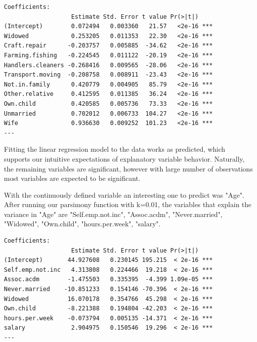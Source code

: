 \documentclass[letter]{article}
\begin{document}
\begin{verbatim}
Coefficients:
                   Estimate Std. Error t value Pr(>|t|)    
(Intercept)        0.072494   0.003360   21.57   <2e-16 ***
Widowed            0.253205   0.011353   22.30   <2e-16 ***
Craft.repair      -0.203757   0.005885  -34.62   <2e-16 ***
Farming.fishing   -0.224545   0.011122  -20.19   <2e-16 ***
Handlers.cleaners -0.268416   0.009565  -28.06   <2e-16 ***
Transport.moving  -0.208758   0.008911  -23.43   <2e-16 ***
Not.in.family      0.420779   0.004905   85.79   <2e-16 ***
Other.relative     0.412595   0.011385   36.24   <2e-16 ***
Own.child          0.420585   0.005736   73.33   <2e-16 ***
Unmarried          0.702012   0.006733  104.27   <2e-16 ***
Wife               0.936630   0.009252  101.23   <2e-16 ***
---

\end{verbatim}

Fitting the linear regression model to the data works as predicted, which supports our intuitive expectations of explanatory variable behavior. Naturally, the remaining variables are significant, however with large number of observations most variables are expected to be significant. 


With the continuously defined variable an interesting one to predict was "Age". After running our parsimony function with k=0.01, the variables that explain the variance in "Age" are "Self.emp.not.inc", "Assoc.acdm", "Never.married", "Widowed", "Own.child", "hours.per.week", "salary".   

\begin{verbatim}
Coefficients:
                   Estimate Std. Error t value Pr(>|t|)    
(Intercept)       44.927608   0.230145 195.215  < 2e-16 ***
Self.emp.not.inc   4.313808   0.224466  19.218  < 2e-16 ***
Assoc.acdm        -1.475503   0.335395  -4.399 1.09e-05 ***
Never.married    -10.851233   0.154146 -70.396  < 2e-16 ***
Widowed           16.070178   0.354766  45.298  < 2e-16 ***
Own.child         -8.221388   0.194804 -42.203  < 2e-16 ***
hours.per.week    -0.073794   0.005135 -14.371  < 2e-16 ***
salary             2.904975   0.150546  19.296  < 2e-16 ***
---
\end{verbatim}
\end{document}

